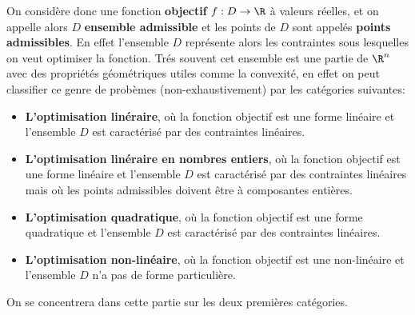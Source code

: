 On considère donc une fonction \textbf{objectif} \( f : D \rightarrow \R \) à valeurs réelles, et on appelle alors \( D \) \textbf{ensemble admissible} et les points de \( D \) sont appelés \textbf{points admissibles}. En effet l'ensemble \( D \) représente alors les contraintes sous lesquelles on veut optimiser la fonction. Trés souvent cet ensemble est une partie de \( \R^n \) avec des propriétés géométriques utiles comme la convexité, en effet on peut classifier ce genre de probèmes (non-exhaustivement) par les catégories suivantes:
\begin{itemize}
   \item \textbf{L'optimisation linéraire}, où la fonction objectif est une forme linéaire et l'ensemble \( D \) est caractérisé par des contraintes linéaires.
   \item \textbf{L'optimisation linéraire en nombres entiers}, où la fonction objectif est une forme linéaire et l'ensemble \( D \) est caractérisé par des contraintes linéaires mais où les points admissibles doivent être à composantes entières.
   \item \textbf{L'optimisation quadratique}, où la fonction objectif est une forme quadratique et l'ensemble \( D \) est caractérisé par des contraintes linéaires.
   \item \textbf{L'optimisation non-linéaire}, où la fonction objectif est une non-linéaire et l'ensemble \( D \) n'a pas de forme particulière.
\end{itemize}
On se concentrera dans cette partie sur les deux premières catégories.

